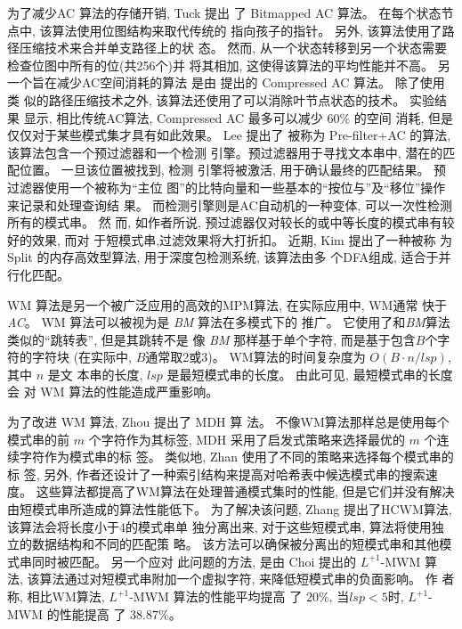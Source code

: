 为了减少\textsf{AC} 算法的存储开销, Tuck \cite{Tuck2004} 提出
了 Bitmapped AC 算法。 在每个状态节点中, 该算法使用位图结构来取代传统的
指向孩子的指针。 另外, 该算法使用了路径压缩技术来合并单支路径上的状
态。 然而, 从一个状态转移到另一个状态需要检查位图中所有的位(共256个)并
将其相加, 这使得该算法的平均性能并不高。 另一个旨在减少AC空间消耗的算法
是由 \cite{Bremler2011} 提出的 \textsf{Compressed AC} 算法。 除了使用类
似的路径压缩技术之外, 该算法还使用了可以消除叶节点状态的技术。 实验结果
显示, 相比传统AC算法, \textsf{Compressed AC} 最多可以减少 $60\%$ 的空间
消耗, 但是仅仅对于某些模式集才具有如此效果。 Lee \cite{Lee2013} 提出了
被称为 \textsf{Pre-filter+AC} 的算法, 该算法包含一个预过滤器和一个检测
引擎。预过滤器用于寻找文本串中, 潜在的匹配位置。 一旦该位置被找到, 检测
引擎将被激活, 用于确认最终的匹配结果。 预过滤器使用一个被称为“主位
图”的比特向量和一些基本的“按位与”及“移位”操作来记录和处理查询结
果。 而检测引擎则是AC自动机的一种变体, 可以一次性检测所有的模式串。 然
而, 如作者所说, 预过滤器仅对较长的或中等长度的模式串有较好的效果, 而对
于短模式串,过滤效果将大打折扣。 近期, Kim \cite{Kim2015} 提出了一种被称
为 \textsf{Split} 的内存高效型算法, 用于深度包检测系统, 该算法由多
个DFA组成, 适合于并行化匹配。

\textsf{WM} 算法是另一个被广泛应用的高效的MPM算法, 在实际应用中, WM通常
快于\emph{AC}。 \textsf{WM} 算法可以被视为是 \emph{BM} 算法在多模式下的
推广。 它使用了和\emph{BM}算法类似的“跳转表”, 但是其跳转不是
像 \emph{BM} 那样基于单个字符, 而是基于包含$B$个字符的字符块 (在实际中,
$B$通常取2或3)。 WM算法的时间复杂度为 $O(B \cdot n/lsp)$, 其中 $n$ 是文
本串的长度, $lsp$ 是最短模式串的长度。 由此可见, 最短模式串的长度会
对 WM 算法的性能造成严重影响。

为了改进 \textsf{WM} 算法, Zhou \cite{Zhou2007} 提出了 \textsf{MDH} 算
法。 不像WM算法那样总是使用每个模式串的前 $m$ 个字符作为其标签,
\textsf{MDH} 采用了启发式策略来选择最优的 $m$ 个连续字符作为模式串的标
签。 类似地, Zhan \cite{Zhan2014} 使用了不同的策略来选择每个模式串的标
签, 另外, 作者还设计了一种索引结构来提高对哈希表中候选模式串的搜索速
度。 这些算法都提高了WM算法在处理普通模式集时的性能, 但是它们并没有解决
由短模式串所造成的算法性能低下。 为了解决该问题, Zhang
\cite{Zhang2009a}提出了\textsf{HCWM}算法, 该算法会将长度小于4的模式串单
独分离出来, 对于这些短模式串, 算法将使用独立的数据结构和不同的匹配策
略。 该方法可以确保被分离出的短模式串和其他模式串同时被匹配。 另一个应对
此问题的方法, 是由 Choi \cite{Choi2011} 提出的 \textsf{$L^{+1}$-MWM} 算
法, 该算法通过对短模式串附加一个虚拟字符, 来降低短模式串的负面影响。 作
者称, 相比WM算法, \textsf{$L^{+1}$-MWM} 算法的性能平均提高
了 $20\%$, 当$lsp < 5$时, \textsf{$L^{+1}$-MWM} 的性能提高
了 $38.87\%$。


